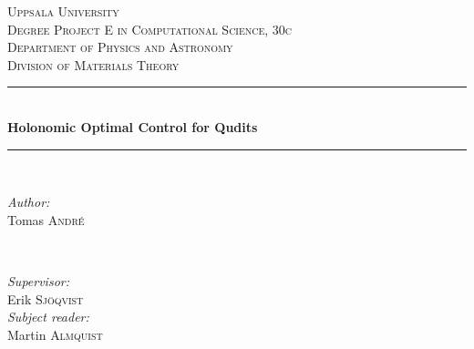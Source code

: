 \documentclass[a4paper, 12pt]{article}
\newcommand{\HRule}{\rule{\linewidth}{0.5mm}} %
\begin{document}
\begin{titlepage}


\center %
 
 
 
 

\textsc{\LARGE Uppsala University}\\[1.5cm] %
\textsc{\Large Degree Project E in Computational Science, 30c}\\[0.5cm] %
\textsc{\large Department of Physics and Astronomy\\ Division of Materials Theory}\\[0.5cm] %


\HRule \\[0.4cm]
{ \huge \bfseries Holonomic Optimal Control for Qudits}\\[0.4cm] %
\HRule \\[1.5cm]
 

\begin{minipage}{0.4\textwidth}
\begin{flushleft} \large
\emph{Author:}\\
Tomas \textsc{André} %
\end{flushleft}
\end{minipage}
~
\begin{minipage}{0.4\textwidth}
\begin{flushright} \large
\emph{Supervisor:} \\
Erik \textsc{Sjöqvist} \\
\emph{Subject reader:} \\
Martin \textsc{Almquist} %
\end{flushright}
\end{minipage}\\[2cm]


\end{titlepage}
\end{document}
